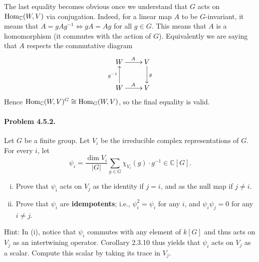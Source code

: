 \documentclass[oneside]{scrbook}
\begin{document}
The last equality becomes obvious once we understand that $G$ acts on $\operatorname{Hom}_{\mathbb C}(W,V)$ via conjugation. Indeed, for a linear map $A$ to be $G$-invariant, it means that $A=gAg^{-1}\iff gA=Ag$ for all $g\in G$. This means that $A$ is a homomorphism (it commutes with the action of $G$). Equivalently we are saying that $A$ respects the commutative diagram
\[\xymatrix{
W \ar[r]^A &V\ar[d]^g\\
W \ar[u]^{g^{-1}} \ar[r]^A &V}
\]
Hence $\operatorname{Hom}_\mathbb C(W,V)^G\cong \operatorname{Hom}_G(W,V)$, so the final equality is valid.

\paragraph{Problem 4.5.2.} Let $G$ be a finite group. Let $V_i$ be the irreducible complex representations of $G$. For every $i$, let
\[\psi_i = \frac{\dim{V_i}}{|G|} \sum_{g \in G} \chi_{V_i} (g) \cdot g^{-1} \in \mathbb{C}[G].\]
\begin{enumerate}[(i)]
    \item Prove that $\psi_i$ acts on $V_j$ as the identity if $j=i$, and as the null map if $j\neq i$.
    \item Prove that $\psi_i$ are \textbf{idempotents}; i.e., $\psi_i^2=\psi_i$ for any $i$, and $\psi_i\psi_j=0$ for any $i\neq j$.
\end{enumerate}
Hint: In (i), notice that $\psi_i$ commutes with any element of $k[G]$ and thus acts on $V_j$ as an intertwining operator. Corollary 2.3.10 thus
yields that $\psi_i$ acts on $V_j$ as a scalar. Compute this scalar by taking
its trace in $V_j$.
\end{document}
